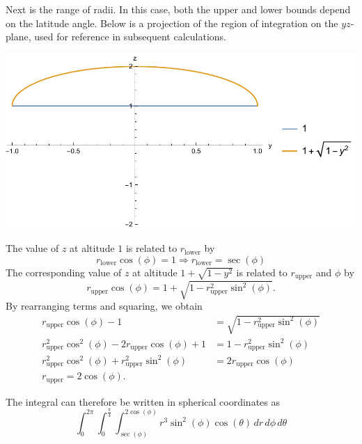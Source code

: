 \documentclass[11pt]{exam}
\begin{document}
\begin{questions}
\begin{parts}
Next is the range of radii. In this case, both the upper and lower bounds depend on the latitude angle. Below is a projection of the region of integration on the $yz$-plane, used for reference in subsequent calculations.

\begin{center}
\includegraphics[scale=0.5]{p3.pdf}
\end{center}

The value of $z$ at altitude $1$ is related to $r_{\mathrm{lower}}$ by 
\begin{equation*}
r_{\mathrm{lower}}\cos(\phi) = 1 \Rightarrow r_{\mathrm{lower}} = \sec(\phi)
\end{equation*}
The corresponding value of $z$ at altitude $1+\sqrt{1-y^2}$ is related to $r_{\mathrm{upper}}$ and $\phi$ by 
\begin{equation*}
r_{\mathrm{upper}}\cos(\phi) = 1+ \sqrt{1-r_{\mathrm{upper}}^{2}\sin^{2}(\phi)}.
\end{equation*}
By rearranging terms and squaring, we obtain
\begin{align*}
r_{\mathrm{upper}}\cos(\phi) -1 & = \sqrt{1-r_{\mathrm{upper}}^{2}\sin^{2}(\phi)} \\
r_{\mathrm{upper}}^2\cos^2(\phi)-2r_{\mathrm{upper}}\cos(\phi)+1 &= 1-r_{\mathrm{upper}}^{2}\sin^{2}(\phi) \\
r_{\mathrm{upper}}^2\cos^2(\phi) + r_{\mathrm{upper}}^{2}\sin^{2}(\phi) & = 2r_{\mathrm{upper}}\cos(\phi) \\
r_{\mathrm{upper}} = 2\cos(\phi).
\end{align*}

The integral can therefore be written in spherical coordinates as 
\begin{equation*}
\int_{0}^{2\pi} \int_{0}^{\frac{\pi}{4}} \int_{\sec(\phi)}^{2\cos(\phi)} r^3\sin^2(\phi)\cos(\theta) \, dr \, d\phi \, d\theta
\end{equation*}
\vfill
\newpage

\end{parts}
\end{questions}
\end{document}
